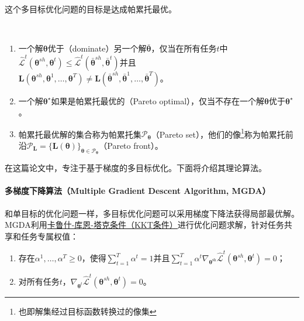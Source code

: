 \documentclass{ctexart}
\begin{document}
这个多目标优化问题的目标是达成帕累托最优。

\begin{definition}[MTL中的帕累托最优] {\ }%
    \normalfont
    \begin{enumerate}[topsep=0pt, label=(\alph*),align=left,leftmargin=*]
    \item 一个解$\bm\theta$优于（dominate）另一个解$\bar{\bm\theta}$，仅当在所有任务$t$中\mbox{$\hat{\mathcal{L}}^t(\bm\theta^{sh},\bm\theta^t)  \leq \hat{\mathcal{L}}^t(\bar{\bm\theta}^{sh},\bar{\bm\theta}^t)$}并且 \\ \mbox{$\mathbf{L}(\bm\theta^{sh}, \bm\theta^1,\ldots,\bm\theta^T) \neq \mathbf{L}(\bar{\bm\theta}^{sh}, \bar{\bm\theta}^1,\ldots,\bar{\bm\theta}^T) $}。
    \item 一个解$\bm\theta^\star$如果是帕累托最优的（Pareto optimal），仅当不存在一个解$\bm\theta$优于$\bm\theta^\star$。
    \item 帕累托最优解的集合称为帕累托集$\mathcal{P}_{\bm\theta}$（Pareto set），他们的像\footnote{也即解集经过目标函数转换过的像集}称为帕累托前沿$\mathcal{P}_{\mathbf{L}}=\{\mathbf{L}(\bm\theta)\}_{\bm\theta\in \mathcal{P}_{\bm\theta}}$（Pareto front）。
    \end{enumerate}
\end{definition}

在这篇论文中，\citet{Sener18Pareto}专注于基于梯度的多目标优化。下面将介绍其理论算法。

\paragraph{多梯度下降算法（Multiple Gradient Descent Algorithm, MGDA）}和单目标的优化问题一样，多目标优化问题可以采用梯度下降法获得局部最优解。MGDA利用\href{https://zh.wikipedia.org/wiki/%E5%8D%A1%E9%B2%81%E4%BB%80-%E5%BA%93%E6%81%A9-%E5%A1%94%E5%85%8B%E6%9D%A1%E4%BB%B6}{卡鲁什-库恩-塔克条件（KKT条件）}进行优化问题求解，针对任务共享和任务专属权值：
\begin{enumerate}
    \item 存在$\alpha^1, \ldots, \alpha^T \geq 0$，使得$\sum^T_{t=1}\alpha^t = 1$并且$\sum^T_{t=1}\alpha^t \nabla_{\bm\theta^\mathrm{sh}} \hat{\mathcal{L}}^t(\bm\theta^{sh},\bm\theta^t) = 0$；
    \item 对所有任务$t$，$\nabla_{\bm\theta^t} \hat{\mathcal{L}}^t(\bm\theta^{sh},\bm\theta^t) = 0$。
\end{enumerate}
\end{document}
